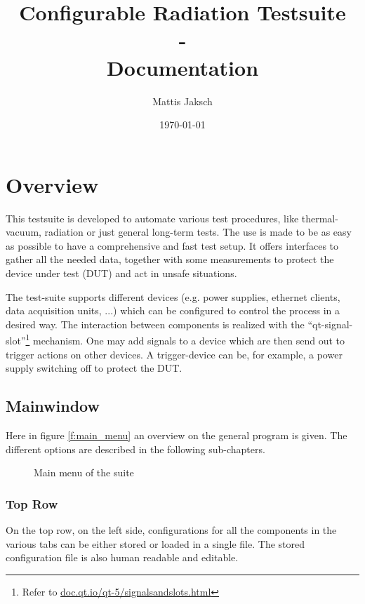 \documentclass[10pt,a4paper]{article}
\title{Configurable Radiation Testsuite \\- \\Documentation}
\author{Mattis Jaksch}
\date{\today}
\begin{document}
\maketitle

\tableofcontents

\flushleft

\newpage

\section{Overview}
This testsuite is developed to automate various test procedures, like thermal-vacuum, radiation or just general long-term tests. The use is made to be as easy as possible to have a comprehensive and fast test setup. It offers interfaces to gather all the needed data, together with some measurements to protect the device under test (DUT) and act in unsafe situations.

\bigbreak

The test-suite supports different devices (e.g. power supplies, ethernet clients, data acquisition units, ...) which can be configured to control the process in a desired way. The interaction between components is realized with the \enquote{qt-signal-slot}\footnote{Refer to \url{doc.qt.io/qt-5/signalsandslots.html}} mechanism. One may add signals to a device which are then send out to trigger actions on other devices. A trigger-device can be, for example, a power supply switching off to protect the DUT.

	\subsection{Mainwindow}
	Here in figure \eqref{f:main_menu} an overview on the general program is given. The different options are described in the following sub-chapters.
	
	\begin{figure}[H]
\centering

\caption{Main menu of the suite}
\label{f:main_menu}
	\end{figure}
	
	\subsubsection{Top Row}	
	
	On the top row, on the left side, configurations for all the components in the various tabs can be either stored or loaded in a single file. The stored configuration file is also human readable and editable.
	
\end{document}
